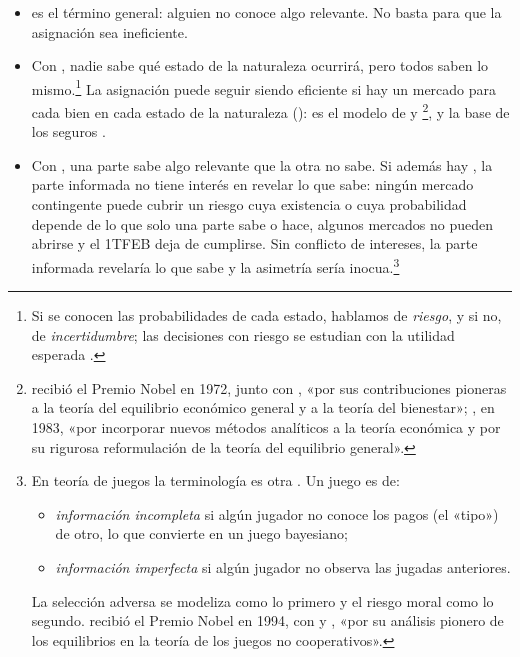 \documentclass[11pt]{article}
\begin{document}
\begin{itemize}
\begin{itemize}
    \begin{itemize}
    \item {} es el término general: alguien no conoce algo relevante. No basta para que la asignación sea ineficiente.
    \item Con , nadie sabe qué estado de la naturaleza ocurrirá, pero todos saben lo mismo.\footnote{Si se conocen las probabilidades de cada estado, hablamos de \emph{riesgo}, y si no, de \emph{incertidumbre}\nocite{Knight1921Risk}; las decisiones con riesgo se estudian con la utilidad esperada .} La asignación puede seguir siendo eficiente si hay un mercado para cada bien en cada estado de la naturaleza (): es el modelo de  y \nocite{Arrow1953Role,Debreu1959Theory} \footnote{ recibió el Premio Nobel en 1972, junto con , «por sus contribuciones pioneras a la teoría del equilibrio económico general y a la teoría del bienestar»\nocite{Nobel1972HicksArrow}; , en 1983, «por incorporar nuevos métodos analíticos a la teoría económica y por su rigurosa reformulación de la teoría del equilibrio general»\nocite{Nobel1983Debreu}.}, y la base de los seguros .
    \item Con , una parte sabe algo relevante que la otra no sabe. Si además hay , la parte informada no tiene interés en revelar lo que sabe: ningún mercado contingente puede cubrir un riesgo cuya existencia o cuya probabilidad depende de lo que solo una parte sabe o hace, algunos mercados no pueden abrirse\nocite{Arrow1963Uncertainty} y el 1TFEB deja de cumplirse. Sin conflicto de intereses, la parte informada revelaría lo que sabe y la asimetría sería inocua.\footnote{En teoría de juegos la terminología es otra . Un juego es de:
\begin{itemize}
\item \emph{información incompleta} si algún jugador no conoce los pagos (el «tipo») de otro, lo que \textcite{Harsanyi1967Games} convierte en un juego bayesiano;
\item \emph{información imperfecta} si algún jugador no observa las jugadas anteriores.
\end{itemize}
La selección adversa se modeliza como lo primero y el riesgo moral como lo segundo.  recibió el Premio Nobel en 1994, con  y , «por su análisis pionero de los equilibrios en la teoría de los juegos no cooperativos»\nocite{Nobel1994Nash}.}

\end{itemize}
\end{itemize}
\end{itemize}
\end{document}

